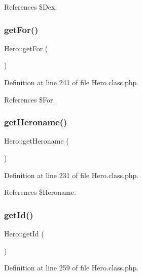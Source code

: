 References \$\+Dex.

\mbox{\label{class_hero_a04d0cabdc6cc33bbfa93476eee37af4e}} 
\subsubsection{\texorpdfstring{get\+For()}{getFor()}}
{\footnotesize\ttfamily Hero\+::get\+For (\begin{DoxyParamCaption}{ }\end{DoxyParamCaption})}



Definition at line 241 of file Hero.\+class.\+php.



References \$\+For.

\mbox{\label{class_hero_a181fd746cd71803d86401e6dd8ac28de}} 
\subsubsection{\texorpdfstring{get\+Heroname()}{getHeroname()}}
{\footnotesize\ttfamily Hero\+::get\+Heroname (\begin{DoxyParamCaption}{ }\end{DoxyParamCaption})}



Definition at line 231 of file Hero.\+class.\+php.



References \$\+Heroname.

\mbox{\label{class_hero_a395e2c32870dc757c39837615368aaa5}} 
\subsubsection{\texorpdfstring{get\+Id()}{getId()}}
{\footnotesize\ttfamily Hero\+::get\+Id (\begin{DoxyParamCaption}{ }\end{DoxyParamCaption})}



Definition at line 259 of file Hero.\+class.\+php.




